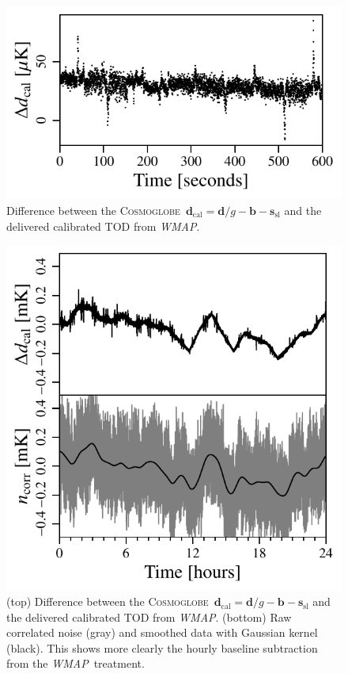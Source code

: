 \documentclass[twocolumn]{../../common/aa}
\def\WMAP{\emph{WMAP}}
\newcommand{\cosmoglobe}{\textsc{Cosmoglobe}}
\begin{document}
\begin{figure}
	\includegraphics[width=\columnwidth]{figures/K113_TOD_diff_10min.pdf}
	\caption{Difference between the \cosmoglobe\ $\boldsymbol d_\mathrm{cal}=\boldsymbol d/g-\boldsymbol b - \boldsymbol s_\mathrm{sl}$ and the delivered calibrated TOD from \WMAP.}
	\label{fig:cal_comp_10min}
\end{figure}

\begin{figure}
	\includegraphics[width=\columnwidth]{figures/K113_TOD_diff_10hr.pdf}
	\caption{(top) Difference between the \cosmoglobe\ $\boldsymbol d_\mathrm{cal}=\boldsymbol d/g-\boldsymbol b - \boldsymbol s_\mathrm{sl}$ and the delivered calibrated TOD from \WMAP. (bottom) Raw correlated noise (gray) and smoothed data with Gaussian kernel (black). This shows more clearly the hourly baseline subtraction from the \WMAP\ treatment.}
	\label{fig:cal_comp}
\end{figure}
\end{document}
